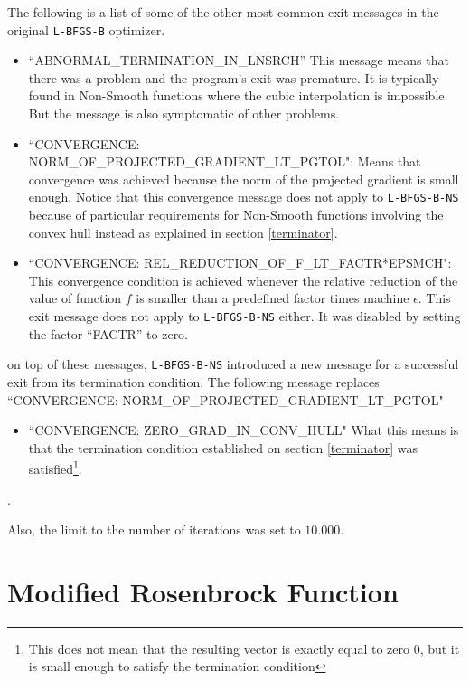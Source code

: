 The following is a list of some of the other most common exit messages in the original \texttt{L-BFGS-B} optimizer.

\begin{itemize}

\item ``ABNORMAL\_TERMINATION\_IN\_LNSRCH'' This message means that there was a problem and the program's exit was premature. It is typically found in Non-Smooth functions where the cubic interpolation is impossible. But the message is also symptomatic of other problems.

\item ``CONVERGENCE: NORM\_OF\_PROJECTED\_GRADIENT\_LT\_PGTOL": Means that convergence was achieved because the norm of the projected gradient is small enough. Notice that this convergence message does not apply to \texttt{L-BFGS-B-NS} because of particular requirements for Non-Smooth functions involving the convex hull instead as explained in section \eqref{terminator}.

\item ``CONVERGENCE: REL\_REDUCTION\_OF\_F\_LT\_FACTR*EPSMCH": This convergence condition is achieved whenever the relative reduction of the value of function $f$ is smaller than a predefined factor times machine $\epsilon$. This exit message does not apply to \texttt{L-BFGS-B-NS} either. It was disabled by setting the factor ``FACTR'' to zero.

\end{itemize}

on top of these messages, \texttt{L-BFGS-B-NS} introduced a new message for a successful exit from its termination condition. The following message replaces ``CONVERGENCE: NORM\_OF\_PROJECTED\_GRADIENT\_LT\_PGTOL"

\begin{itemize}
\item ``CONVERGENCE: ZERO\_GRAD\_IN\_CONV\_HULL" What this means is that the termination condition established on section \eqref{terminator} was satisfied\footnote{This does not mean that the resulting vector is exactly equal to zero $0$, but it is small enough to satisfy the termination condition}.
\end{itemize}.

Also, the limit to the number of iterations was set to $10.000$.

\section{Modified Rosenbrock Function} \label{ros}

